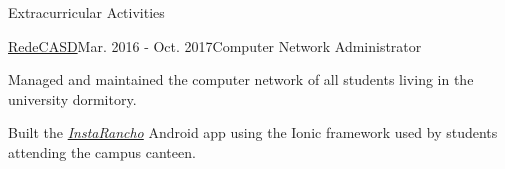 \documentclass{resume} %
\begin{document}
\begin{rSection}{Extracurricular Activities}

\begin{rSubsection}{\href{http://www.aeitaonline.com.br/wiki/index.php?title=RedeCASD}{RedeCASD}}{Mar. 2016 - Oct. 2017}{Computer Network Administrator}{}
\item Managed and maintained the computer network of all students living in the university dormitory.
\item Built the \href{https://github.com/GuiPCLeao/InstaRancho}{\textit{InstaRancho}} Android app using the Ionic framework used by students attending the campus canteen.
\end{rSubsection}




\end{rSection}

\vspace{-0.3cm}


\end{document}
